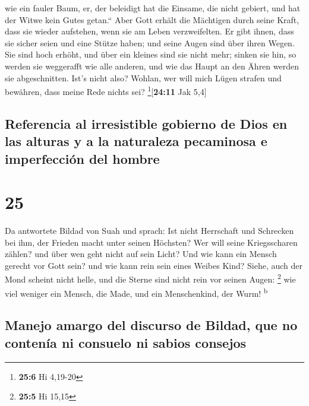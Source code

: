 wie ein fauler Baum,  er, der beleidigt hat die Einsame,
die nicht gebiert, und hat der Witwe kein Gutes getan.`` 
Aber Gott erhält die Mächtigen durch seine Kraft, dass sie wieder
aufstehen, wenn sie am Leben verzweifelten.  Er gibt
ihnen, dass sie sicher seien und eine Stütze haben; und seine Augen sind
über ihren Wegen.  Sie sind hoch erhöht, und über ein
kleines sind sie nicht mehr; sinken sie hin, so werden sie weggerafft
wie alle anderen, und wie das Haupt an den Ähren werden sie
abgeschnitten.  Ist's nicht also? Wohlan, wer will mich
Lügen strafen und bewähren, dass meine Rede nichts sei?
\footnote{\textbf{25:6} Hi 4,19-20}{[}\textbf{24:11} Jak 5,4{]}

\hypertarget{referencia-al-irresistible-gobierno-de-dios-en-las-alturas-y-a-la-naturaleza-pecaminosa-e-imperfecciuxf3n-del-hombre}{%
\subsection{Referencia al irresistible gobierno de Dios en las alturas y
a la naturaleza pecaminosa e imperfección del
hombre}\label{referencia-al-irresistible-gobierno-de-dios-en-las-alturas-y-a-la-naturaleza-pecaminosa-e-imperfecciuxf3n-del-hombre}}

\hypertarget{section-24}{%
\section{25}\label{section-24}}

 Da antwortete Bildad von Suah und sprach: 
Ist nicht Herrschaft und Schrecken bei ihm, der Frieden macht unter
seinen Höchsten?  Wer will seine Kriegsscharen zählen? und
über wen geht nicht auf sein Licht?  Und wie kann ein
Mensch gerecht vor Gott sein? und wie kann rein sein eines Weibes Kind?
 Siehe, auch der Mond scheint nicht helle, und die Sterne
sind nicht rein vor seinen Augen: \footnote{\textbf{25:5} Hi 15,15}
 wie viel weniger ein Mensch, die Made, und ein
Menschenkind, der Wurm! \textsuperscript{b}

\hypertarget{manejo-amargo-del-discurso-de-bildad-que-no-contenuxeda-ni-consuelo-ni-sabios-consejos}{%
\subsection{Manejo amargo del discurso de Bildad, que no contenía ni
consuelo ni sabios
consejos}\label{manejo-amargo-del-discurso-de-bildad-que-no-contenuxeda-ni-consuelo-ni-sabios-consejos}}

